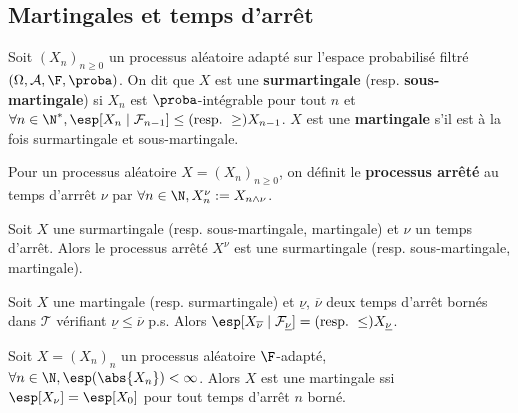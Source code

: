 \subsection{Martingales et temps d'arrêt}

	\begin{defn}
		Soit $(X_n)_{n \geq 0}$ un processus aléatoire adapté sur l'espace probabilisé filtré $(\Omega, \mathcal{A}, \F, \proba)$.
		On dit que $X$ est une \textbf{surmartingale} (resp. \textbf{sous-martingale}) si $X_n$ est $\proba$-intégrable pour tout $n$ et $\forall n \in \N^*, \esp[X_n \mid \mathcal{F}_{n - 1}] \leq (\text{resp.}\ \geq) X_{n - 1}$.
		$X$ est une \textbf{martingale} s'il est à la fois surmartingale et sous-martingale.
	\end{defn}

	\begin{defn}
		Pour un processus aléatoire $X = (X_n)_{n \geq 0}$, on définit le \textbf{processus arrêté} au temps d'arrrêt $\nu$ par $\forall n \in \N, X^\nu_n := X_{n \wedge \nu}$.
	\end{defn}
	
	\begin{lem}
		Soit $X$ une surmartingale (resp. sous-martingale, martingale) et $\nu$ un temps d'arrêt.
		Alors le processus arrêté $X^\nu$ est une surmartingale (resp. sous-martingale, martingale).
	\end{lem}

	\begin{thm}
		Soit $X$ une martingale (resp. surmartingale) et $\underline{\nu}$, $\overline{\nu}$ deux temps d'arrêt bornés dans $\mathcal{T}$ vérifiant $\underline{\nu} \leq \overline{\nu}$ p.s.
		Alors $\esp[X_{\overline{\nu}} \mid \mathcal{F}_{\underline{\nu}}] = (\text{resp.}\ \leq) X_{\underline{\nu}}$.
	\end{thm}

	\begin{pop}
		Soit $X = (X_n)_n$ un processus aléatoire $\F$-adapté, $\forall n \in \N, \esp(\abs{X_n}) < \infty$.
		Alors $X$ est une martingale ssi $\esp[X_\nu] = \esp[X_0]$ pour tout temps d'arrêt $n$ borné.
	\end{pop}
